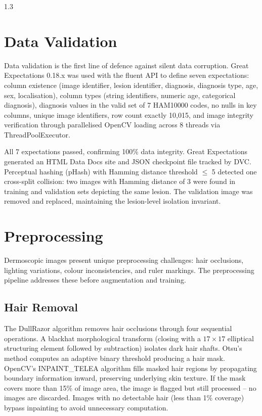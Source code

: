 \begin{spacing}{1.3}
\section{Data Validation}

Data validation is the first line of defence against silent data corruption. Great Expectations 0.18.x was used with the fluent API to define seven expectations: column existence (image identifier, lesion identifier, diagnosis, diagnosis type, age, sex, localisation), column types (string identifiers, numeric age, categorical diagnosis), diagnosis values in the valid set of 7 HAM10000 codes, no nulls in key columns, unique image identifiers, row count exactly 10,015, and image integrity verification through parallelised OpenCV loading across 8 threads via ThreadPoolExecutor.

All 7 expectations passed, confirming 100\% data integrity. Great Expectations generated an HTML Data Docs site and JSON checkpoint file tracked by DVC. Perceptual hashing (pHash) with Hamming distance threshold $\leq$ 5 detected one cross-split collision: two images with Hamming distance of 3 were found in training and validation sets depicting the same lesion. The validation image was removed and replaced, maintaining the lesion-level isolation invariant.

\section{Preprocessing}

Dermoscopic images present unique preprocessing challenges: hair occlusions, lighting variations, colour inconsistencies, and ruler markings. The preprocessing pipeline addresses these before augmentation and training.

\subsection{Hair Removal}

The DullRazor algorithm removes hair occlusions through four sequential operations. A blackhat morphological transform (closing with a \(17 \times 17\) elliptical structuring element followed by subtraction) isolates dark hair shafts. Otsu's method computes an adaptive binary threshold producing a hair mask. OpenCV's INPAINT\_TELEA algorithm fills masked hair regions by propagating boundary information inward, preserving underlying skin texture. If the mask covers more than 15\% of image area, the image is flagged but still processed -- no images are discarded. Images with no detectable hair (less than 1\% coverage) bypass inpainting to avoid unnecessary computation.


\end{spacing}
